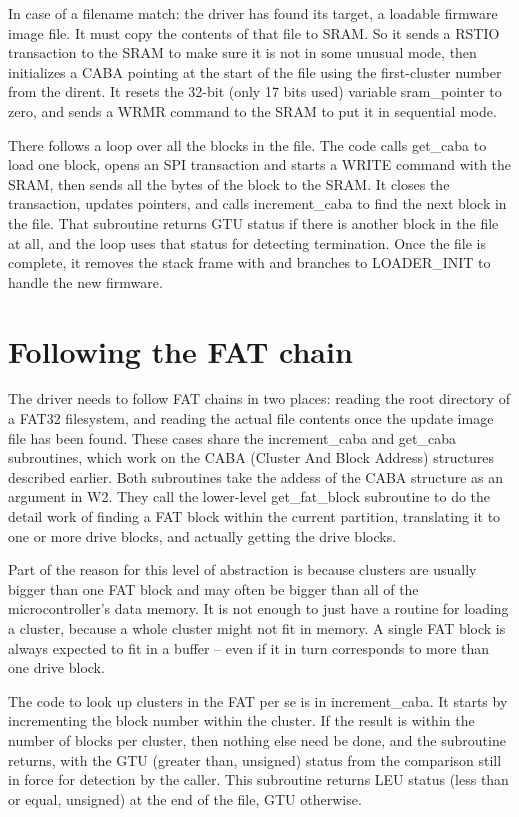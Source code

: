 In case of a filename match:  the driver has found its target, a loadable
firmware image file.  It must copy the contents of that file to SRAM.  So it
sends a RSTIO transaction to the SRAM to make sure it is not in some unusual
mode, then initializes a CABA pointing at the start of the file using the
first-cluster number from the dirent.  It resets the 32-bit (only 17 bits
used) variable sram\_pointer to zero, and sends a WRMR command to the SRAM
to put it in sequential mode.

There follows a loop over all the blocks in the file.  The code calls
get\_caba to load one block, opens an SPI transaction and starts a WRITE
command with the SRAM, then sends all the bytes of the block to the SRAM. 
It closes the transaction, updates pointers, and calls increment\_caba to
find the next block in the file.  That subroutine returns GTU status if
there is another block in the file at all, and the loop uses that status for
detecting termination.  Once the file is complete, it removes the stack
frame with  and branches to LOADER\_INIT to handle the new
firmware.

\section{Following the FAT chain}

The driver needs to follow FAT chains in two places:  reading the root
directory of a FAT32 filesystem, and reading the actual file contents once
the update image file has been found.  These cases share the
increment\_caba and get\_caba subroutines, which work on the CABA (Cluster
And Block Address) structures described earlier.  Both subroutines take the
addess of the CABA structure as an argument in W2.  They call
the lower-level get\_fat\_block subroutine to do the detail work of finding
a FAT block within the current partition, translating it to one or more
drive blocks, and actually getting the drive blocks.

Part of the reason for this level of abstraction is because
clusters are usually bigger than one FAT block and may often be bigger than
all of the microcontroller's data memory.  It is not enough to just have a
routine for loading a cluster, because a whole cluster might not fit in
memory.  A single FAT block is always expected to fit in a buffer
-- even if it in turn corresponds to more than one drive block.

The code to look up clusters in the FAT per se is in increment\_caba.  It
starts by incrementing the block number within the cluster.  If the result
is within the number of blocks per cluster, then nothing else need be done,
and the subroutine returns, with the GTU (greater than, unsigned) status
from the comparison still in force for detection by the caller.  This
subroutine returns LEU status (less than or equal, unsigned) at the end of
the file, GTU otherwise.

